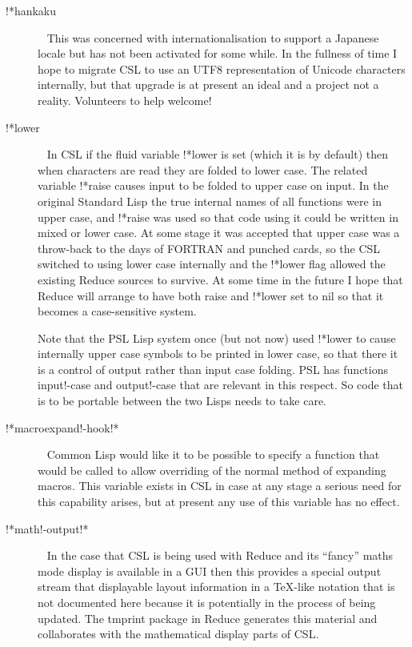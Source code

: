 \documentclass[a4paper,11pt]{article}
\begin{document}
\begin{description}
\item [{\ttfamily !*hankaku}]  ~\newline
This was concerned with internationalisation to support a Japanese
locale but has not been activated for some while. In the fullness of time I
hope to migrate CSL to use an UTF8 representation of Unicode characters
internally, but that upgrade is at present an ideal and a project not
a reality. Volunteers to help welcome!

\item [{\ttfamily !*lower}]  ~\newline
In CSL if the fluid variable {\ttfamily !*lower} is set (which it is
by default) then when characters are read they are folded to lower case.
The related variable {\ttfamily !*raise} causes input to be folded to
upper case on input. In the original Standard Lisp the true internal names
of all functions were in upper case, and {\ttfamily !*raise} was used so
that code using it could be written in mixed or lower case. At some stage
it was accepted that upper case was a throw-back to the days of FORTRAN
and punched cards, so the CSL switched to using lower case
internally and the {\ttfamily !*lower} flag allowed the existing Reduce
sources to survive. At some time in the future I hope that Reduce will
arrange to have both {\ttfamily *raise} and {\ttfamily !*lower} set to
{\ttfamily nil} so that it becomes a case-sensitive system.
  
Note that the PSL Lisp system once (but not now) used {\ttfamily !*lower}
to cause internally upper case symbols to be printed in lower case,
so that there it is a control of output rather than input case folding.
PSL has functions {\ttfamily input!-case} and {\ttfamily output!-case}
that are relevant in this respect.
So code that is to be portable between the two Lisps needs to take care.

\item [{\ttfamily !*macroexpand!-hook!*}]  ~\newline
Common Lisp would like it to be possible to specify a function that would
be called to allow overriding of the normal method of expanding macros. This
variable exists in CSL in case at any stage a serious need for this
capability arises, but at present any use of this variable has no effect.

\item [{\ttfamily !*math!-output!*}]  ~\newline
In the case that CSL is being used with Reduce and its ``fancy'' maths mode
display is available in a GUI then this provides a special output
stream that displayable layout information in a {\TeX}-like notation that
is not documented here because it is potentially in the process of being
updated. The {\ttfamily tmprint} package in Reduce generates this
material and collaborates with the mathematical display parts of CSL.


\end{description}
\end{document}
